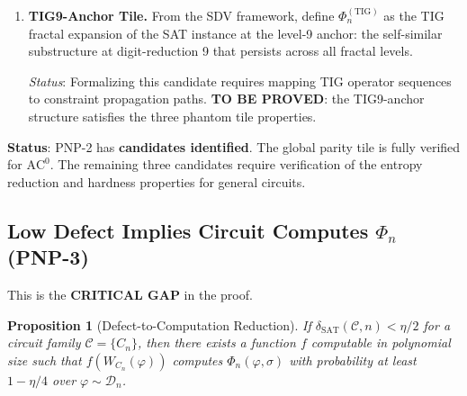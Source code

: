 \documentclass[11pt]{article}
\newtheorem{proposition}[theorem]{Proposition}
\theoremstyle{definition}
\theoremstyle{remark}
\newcommand{\calC}{\mathcal{C}}
\newcommand{\calD}{\mathcal{D}}
\newcommand{\ACz}{\mathrm{AC}^0}
\newcommand{\dSAT}{\delta_{\mathrm{SAT}}}
\begin{document}
\begin{enumerate}
    \emph{Verification}: (1) $\Phi_n^{(\mathrm{plant})}$ depends on all $n$ coordinates
    of~$\sigma$. (2) Entropy reduction: $\langle \sigma, \sigma^* \rangle \bmod q$
    reveals $\log q$ bits about the planted structure. (3) Hardness: conditional on
    the planted SAT hardness conjecture.

  \item \textbf{TIG9-Anchor Tile.}
    From the SDV framework, define $\Phi_n^{(\mathrm{TIG})}$ as the TIG fractal
    expansion of the SAT instance at the level-9 anchor: the self-similar
    substructure at digit-reduction 9 that persists across all fractal levels.

    \emph{Status}: Formalizing this candidate requires mapping TIG operator sequences
    to constraint propagation paths.  \textbf{TO BE PROVED}: the TIG9-anchor
    structure satisfies the three phantom tile properties.
\end{enumerate}

\textbf{Status}: PNP-2 has \textbf{candidates identified}.  The global parity tile
is fully verified for $\ACz$.  The remaining three candidates require verification
of the entropy reduction and hardness properties for general circuits.

\subsection{Low Defect Implies Circuit Computes $\Phi_n$ (PNP-3)}

This is the \textbf{CRITICAL GAP} in the proof.

\begin{proposition}[Defect-to-Computation Reduction]
\label{prop:defect-computation}
If $\dSAT(\calC, n) < \eta/2$ for a circuit family $\calC = \{C_n\}$,
then there exists a function $f$ computable in polynomial size such that
$f(W_{C_n}(\varphi))$ computes $\Phi_n(\varphi, \sigma)$ with probability
at least $1 - \eta/4$ over $\varphi \sim \calD_n$.
\end{proposition}
\end{document}
